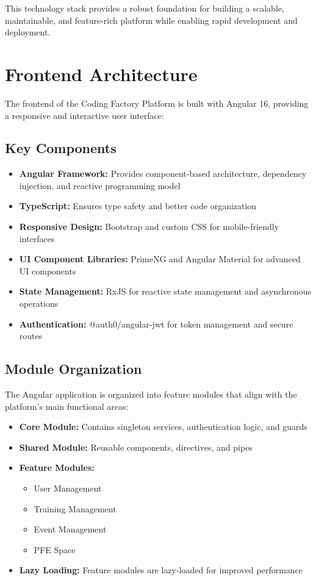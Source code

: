 \documentclass[12pt,a4paper]{report}
\begin{document}
This technology stack provides a robust foundation for building a scalable, maintainable, and feature-rich platform while enabling rapid development and deployment.

\section{Frontend Architecture}

The frontend of the Coding Factory Platform is built with Angular 16, providing a responsive and interactive user interface:

\subsection{Key Components}

\begin{itemize}
    \item \textbf{Angular Framework:} Provides component-based architecture, dependency injection, and reactive programming model
    \item \textbf{TypeScript:} Ensures type safety and better code organization
    \item \textbf{Responsive Design:} Bootstrap and custom CSS for mobile-friendly interfaces
    \item \textbf{UI Component Libraries:} PrimeNG and Angular Material for advanced UI components
    \item \textbf{State Management:} RxJS for reactive state management and asynchronous operations
    \item \textbf{Authentication:} @auth0/angular-jwt for token management and secure routes
\end{itemize}

\subsection{Module Organization}

The Angular application is organized into feature modules that align with the platform's main functional areas:

\begin{itemize}
    \item \textbf{Core Module:} Contains singleton services, authentication logic, and guards
    \item \textbf{Shared Module:} Reusable components, directives, and pipes
    \item \textbf{Feature Modules:}
    \begin{itemize}
        \item User Management
        \item Training Management
        \item Event Management
        \item PFE Space
    \end{itemize}
    \item \textbf{Lazy Loading:} Feature modules are lazy-loaded for improved performance
\end{itemize}
\end{document}
